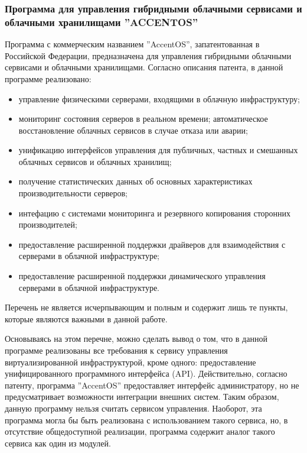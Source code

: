 \subsubsection*{Программа для управления гибридными облачными сервисами и облачными хранилищами
''ACCENTOS''}
Программа с коммерческим названием ''AccentOS'', запатентованная в Российской Федерации\cite{accentos}, предназначена для управления гибридными облачными сервисами и облачными хранилищами.
Согласно описания патента, в данной программе реализовано:
\begin{itemize}
    \item управление физическими серверами, входящими в облачную инфраструктуру; 
    \item мониторинг состояния серверов в реальном времени; автоматическое восстановление облачных сервисов в случае отказа или аварии;
    \item унификацию интерфейсов управления для публичных, частных и смешанных облачных сервисов и облачных хранилищ;
    \item получение статистических данных об основных характеристиках производительности серверов;
    \item интефацию с системами мониторинга и резервного копирования сторонних производителей;
    \item предоставление расширенной поддержки драйверов для взаимодействия с серверами в облачной инфраструктуре;
    \item предоставление расширенной поддержки динамического управления серверами в облачной инфраструктуре.
\end{itemize}
Перечень не является исчерпывающим и полным и содержит лишь те пункты, которые являются важными в данной работе.

Основываясь на этом перечне, можно сделать вывод о том, что в данной программе реализованы все требования к сервису управления виртуализированной инфраструктурой, кроме одного: предоставление унифицированного программного интерфейса (API).
Действительно, согласно патенту, программа ''AccentOS'' предоставляет интерфейс администратору, но не предусматривает возможности интеграции внешних систем.
Таким образом, данную программу нельзя считать сервисом управления.
Наоборот, эта программа могла бы быть реализована с использованием такого сервиса, но, в отсутствие общедоступной реализации, программа содержит аналог такого сервиса как один из модулей.
